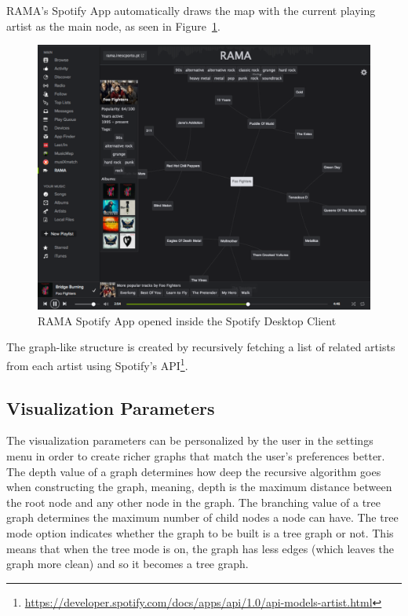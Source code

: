 \documentclass{article}
\begin{document}
      RAMA's Spotify App automatically draws the map with the current playing artist as the main node, as seen in Figure~\ref{fig:spotify_app}.
      \begin{figure}[hb]
        \begin{center}
          \includegraphics[width=\columnwidth]{../report/figures/graph_rootnode.pdf}
        \end{center}
        \caption{RAMA Spotify App opened inside the Spotify Desktop Client}
        \label{fig:spotify_app}
      \end{figure}
      The graph-like structure is created by recursively fetching a list of related artists from each artist using Spotify's API\footnote{\url{https://developer.spotify.com/docs/apps/api/1.0/api-models-artist.html}}.

    \subsection{Visualization Parameters} 
    \label{sub:visualization_parameters}

      The visualization parameters can be personalized by the user in the settings menu in order to create richer graphs that match the user's preferences better.
      The depth value of a graph determines how deep the recursive algorithm goes when constructing the graph, meaning, depth is the maximum distance between the root node and any other node in the graph.
      The branching value of a tree graph determines the maximum number of child nodes a node can have.
      The tree mode option indicates whether the graph to be built is a tree graph or not.
      This means that when the tree mode is on, the graph has less edges (which leaves the graph more clean) and so it becomes a tree graph.
\end{document}
